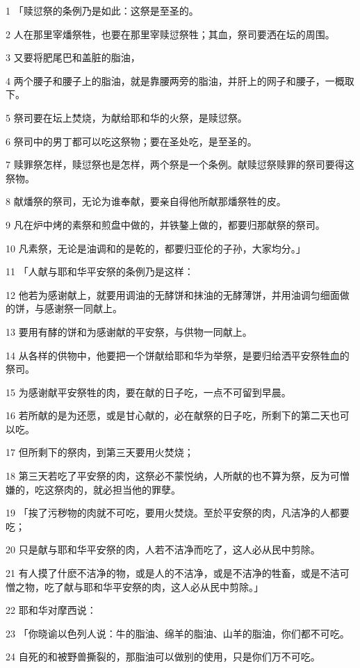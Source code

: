 \par 1 「赎愆祭的条例乃是如此：这祭是至圣的。
\par 2 人在那里宰燔祭牲，也要在那里宰赎愆祭牲；其血，祭司要洒在坛的周围。
\par 3 又要将肥尾巴和盖脏的脂油，
\par 4 两个腰子和腰子上的脂油，就是靠腰两旁的脂油，并肝上的网子和腰子，一概取下。
\par 5 祭司要在坛上焚烧，为献给耶和华的火祭，是赎愆祭。
\par 6 祭司中的男丁都可以吃这祭物；要在圣处吃，是至圣的。
\par 7 赎罪祭怎样，赎愆祭也是怎样，两个祭是一个条例。献赎愆祭赎罪的祭司要得这祭物。
\par 8 献燔祭的祭司，无论为谁奉献，要亲自得他所献那燔祭牲的皮。
\par 9 凡在炉中烤的素祭和煎盘中做的，并铁鏊上做的，都要归那献祭的祭司。
\par 10 凡素祭，无论是油调和的是乾的，都要归亚伦的子孙，大家均分。」
\par 11 「人献与耶和华平安祭的条例乃是这样：
\par 12 他若为感谢献上，就要用调油的无酵饼和抹油的无酵薄饼，并用油调匀细面做的饼，与感谢祭一同献上。
\par 13 要用有酵的饼和为感谢献的平安祭，与供物一同献上。
\par 14 从各样的供物中，他要把一个饼献给耶和华为举祭，是要归给洒平安祭牲血的祭司。
\par 15 为感谢献平安祭牲的肉，要在献的日子吃，一点不可留到早晨。
\par 16 若所献的是为还愿，或是甘心献的，必在献祭的日子吃，所剩下的第二天也可以吃。
\par 17 但所剩下的祭肉，到第三天要用火焚烧；
\par 18 第三天若吃了平安祭的肉，这祭必不蒙悦纳，人所献的也不算为祭，反为可憎嫌的，吃这祭肉的，就必担当他的罪孽。
\par 19 「挨了污秽物的肉就不可吃，要用火焚烧。至於平安祭的肉，凡洁净的人都要吃；
\par 20 只是献与耶和华平安祭的肉，人若不洁净而吃了，这人必从民中剪除。
\par 21 有人摸了什麽不洁净的物，或是人的不洁净，或是不洁净的牲畜，或是不洁可憎之物，吃了献与耶和华平安祭的肉，这人必从民中剪除。」
\par 22 耶和华对摩西说：
\par 23 「你晓谕以色列人说：牛的脂油、绵羊的脂油、山羊的脂油，你们都不可吃。
\par 24 自死的和被野兽撕裂的，那脂油可以做别的使用，只是你们万不可吃。
